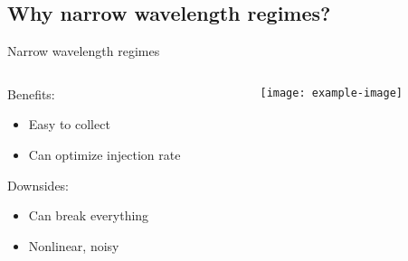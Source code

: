 \subsection{Why narrow wavelength regimes?}

\begin{frame}[t]{Narrow wavelength regimes}

\begin{columns}
\begin{column}{0.5\linewidth}
Benefits:
        \smallskip
    \begin{itemize}
        \item Easy to collect
        \smallskip
        \item Can optimize injection rate
    \end{itemize}
        \bigskip
Downsides:
    \begin{itemize}
        \smallskip
        \item Can break everything
        \smallskip
        \item Nonlinear, noisy
    \end{itemize}
\end{column}
\begin{column}{0.5\linewidth}
    \begin{figure}
        \centering
        \texttt{[image: example-image]}
        \caption{\cite{allen2019fast}}
    \end{figure}
\end{column}
\end{columns}
\end{frame}

